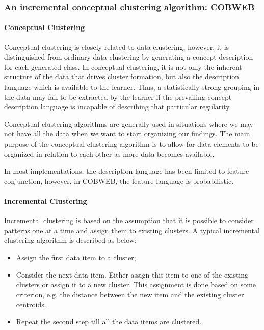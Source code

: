 \subsubsection{An incremental conceptual clustering algorithm: COBWEB}

\paragraph{Conceptual Clustering}
Conceptual clustering is closely related to data clustering, however, it is distinguished from ordinary data clustering by generating a concept description for each generated class. In conceptual clustering, it is not only the inherent structure of the data that drives cluster formation, but also the description language which is available to the learner. Thus, a statistically strong grouping in the data may fail to be extracted by the learner if the prevailing concept description language is incapable of describing that particular regularity\cite{wikiconceptualclustering}. 

Conceptual clustering algorithms are generally used in situations where we may not have all the data when we want to start organizing our findings. The main purpose of the conceptual clustering algorithm is to allow for data elements to be organized in relation to each other as more data becomes available.

In most implementations, the description language has been limited to feature conjunction, however, in COBWEB, the feature language is probabilistic.

\paragraph {Incremental Clustering}
Incremental clustering is based on the assumption that it is possible to consider patterns one at a time and assign them to existing clusters. A typical incremental clustering algorithm is described as below\cite{jain1999data}:
\begin{itemize}\setlength{\itemsep}{0.01pt}
\item Assign the first data item to a cluster;
\item Consider the next data item. Either assign this item to one of the existing clusters or assign it to a new cluster. This assignment is done based on some criterion, e.g. the distance between the new item and the existing cluster centroids.
\item Repeat the second step till all the data items are clustered.
\end{itemize}

